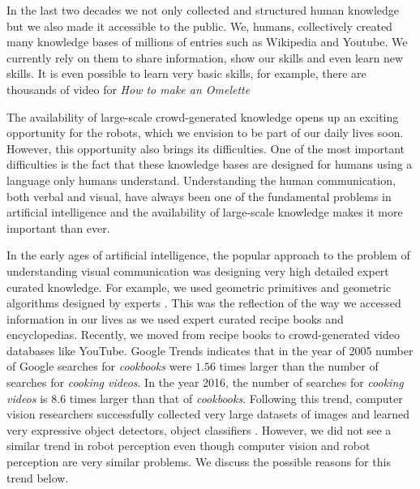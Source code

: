 
In the last two decades we not only collected and structured human knowledge but we also made it accessible to the public. We, humans, collectively created many knowledge bases of millions of entries such as Wikipedia and Youtube. We currently rely on them to share information, show our skills and even learn new skills. It is even possible to learn very basic skills, for example, there are thousands of video for \emph{How to make an Omelette}

The availability of large-scale crowd-generated knowledge opens up an exciting opportunity for the robots, which we envision to be part of our daily lives soon. However, this opportunity also brings its difficulties. One of the most important difficulties is the fact that these knowledge bases are designed for humans using a language only humans understand. Understanding the human communication, both verbal and visual, have always been one of the fundamental problems in artificial intelligence and the availability of large-scale knowledge makes it more important than ever.

In the early ages of artificial intelligence, the popular approach to the problem of understanding visual communication was designing very high detailed expert curated knowledge. For example, we used geometric primitives and geometric algorithms designed by experts \cite{cylinder}. This was the reflection of the way we accessed information in our lives as we used expert curated recipe books and encyclopedias. Recently, we moved from recipe books to crowd-generated video databases like YouTube. Google Trends\cite{google_trends} indicates that in the year of 2005 number of Google searches for \emph{cookbooks} were $1.56$ times larger than the number of searches for \emph{cooking videos}. In the year 2016, the number of searches for \emph{cooking videos} is $8.6$ times larger than that of \emph{cookbooks}. Following this trend, computer vision researchers successfully collected very large datasets of images and learned very expressive object detectors\cite{rcnn}, object classifiers \cite{alexnet,vggnet,googlenet,residual}. However, we did not see a similar trend in robot perception even though computer vision and robot perception are very similar problems. We discuss the possible reasons for this trend below.

